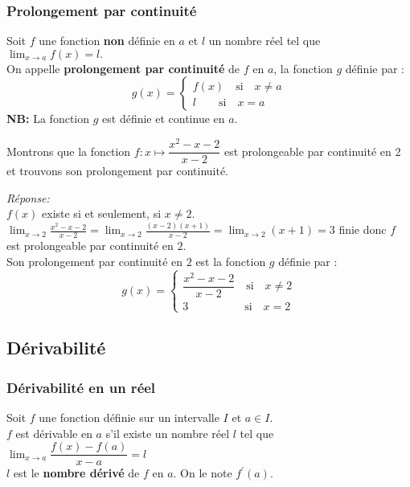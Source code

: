 \subsubsection*{Prolongement par continuité}
\begin{definition}
Soit $ f $ une fonction  \textbf{non}  définie en $ a $ et $ l $ un nombre réel tel que $ \displaystyle\lim_{x \to a}f(x)=l. $\\
On appelle \textbf{prolongement par continuité } de $ f $ en $ a $, la fonction $ g $ définie par :
\[ g (x)=\left\{\begin{array}{l} f(x)\quad \textrm{si} \quad x\neq a \\ l                      \quad \quad \textrm{si}\quad x= a  \end{array} \right.\]
\textbf{NB:} La fonction $ g $ est définie et continue en $ a $.
\end{definition}
\begin{example}
Montrons que la fonction $ f: x \mapsto \dfrac{x^{2}-x-2}{x-2} $   est prolongeable par continuité en 2 et trouvons son prolongement par continuité.
\end{example}

\textsl{Réponse:}\\
$ f(x) $ existe si et seulement, si $ x\neq 2 $.\\  $\displaystyle\lim_{x \to 2 }\frac{x^{2}-x-2}{x-2}=\displaystyle\lim_{x \to 2 }\frac{(x-2)(x+1)}{x-2}= \displaystyle\lim_{x \to 2 }(x+1)=3 $   finie donc $ f $ est prolongeable par continuité en $ 2. $\\
Son prolongement par continuité en $ 2$ est la fonction $ g $ définie par : 
\[ g (x)=\left\{\begin{array}{l} \dfrac{x^{2}-x-2}{x-2} \quad \textrm{si} \quad x\neq 2 \\ 3\quad \quad \qquad \quad  \textrm{si}\quad x= 2  \end{array} \right.\]

\subsection{Dérivabilité}
\subsubsection*{Dérivabilité en un réel}
\begin{definition}
Soit $ f $ une fonction définie sur un intervalle $ I$ et $a\in I $.\\
$ f $ est dérivable en $ a $ s'il existe un nombre réel $ l $ tel que $ \displaystyle\lim_{x \to a} \dfrac{f(x)-f(a)}{x-a}=l $ \\
$ l $ est le  \textbf{nombre dérivé} de $ f $ en $ a. $ On le note $f^{'}(a)$.
\end{definition}

